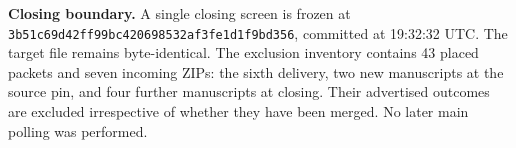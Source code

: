 \textbf{Closing boundary.} A single closing screen is frozen at \texttt{3b51c69d42ff99bc420698532af3fe1d1f9bd356}, committed at 19:32:32 UTC. The target file remains byte-identical. The exclusion inventory contains 43 placed packets and seven incoming ZIPs: the sixth delivery, two new manuscripts at the source pin, and four further manuscripts at closing. Their advertised outcomes are excluded irrespective of whether they have been merged. No later main polling was performed.
